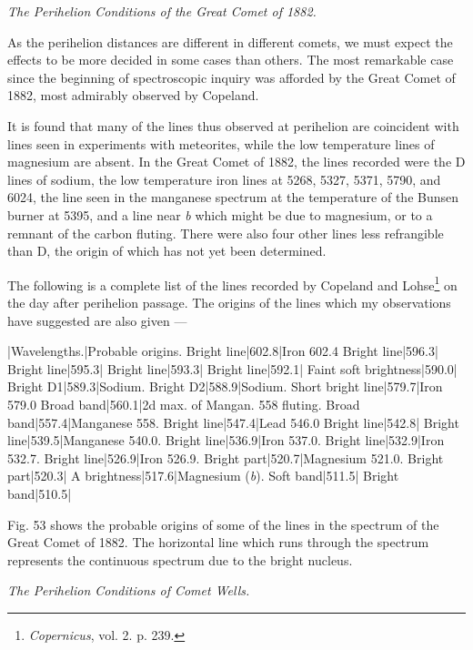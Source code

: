 \documentclass[a4paper, 12pt, oneside, polutonikogreek, english]{article}
\begin{document}
\emph{The Perihelion Conditions of the Great Comet of 1882.}

As the perihelion distances are different in different comets, we must expect the effects to be more decided in some cases than others. The most remarkable case since the beginning of spectroscopic inquiry was afforded by the Great Comet of 1882, most admirably observed by Copeland.

It is found that many of the lines thus observed at perihelion are coincident with lines seen in experiments with meteorites, while the low temperature lines of magnesium are absent. In the Great Comet of 1882, the lines recorded were the D lines of sodium, the low temperature iron lines at 5268, 5327, 5371, 5790, and 6024, the line seen in the manganese spectrum at the temperature of the Bunsen burner at 5395, and a line near \emph{b} which might be due to magnesium, or to a remnant of the carbon fluting. There were also four other lines less refrangible than D, the origin of which has not yet been determined.

The following is a complete list of the lines recorded by Copeland and Lohse\footnote{\emph{Copernicus}, vol. 2. p. 239.} on the day after perihelion passage. The origins of the lines which my observations have suggested are also given ---

|Wavelengths.|Probable origins. 
Bright line|602.8|Iron 602.4 
Bright line|596.3| 
Bright line|595.3| 
Bright line|593.3| 
Bright line|592.1| 
Faint soft brightness|590.0| 
Bright D1|589.3|Sodium. 
Bright D2|588.9|Sodium. 
Short bright line|579.7|Iron 579.0 
Broad band|560.1|2d max. of Mangan. 558 fluting. 
Broad band|557.4|Manganese 558. 
Bright line|547.4|Lead 546.0 
Bright line|542.8| 
Bright line|539.5|Manganese 540.0. 
Bright line|536.9|Iron 537.0. 
Bright line|532.9|Iron 532.7. 
Bright line|526.9|Iron 526.9. 
Bright part|520.7|Magnesium 521.0. 
Bright part|520.3| 
A brightness|517.6|Magnesium (\emph{b}). 
Soft band|511.5| 
Bright band|510.5| 

Fig. 53 shows the probable origins of some of the lines in the spectrum of the Great Comet of 1882. The horizontal line which runs through the spectrum represents the continuous spectrum due to the bright nucleus.

\emph{The Perihelion Conditions of Comet Wells.}
\end{document}
